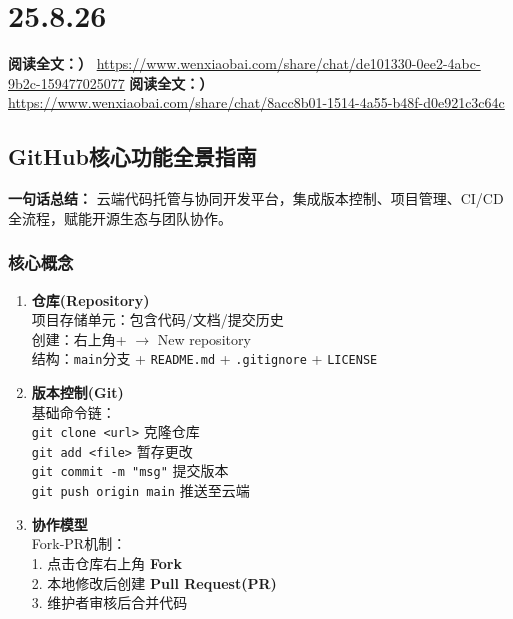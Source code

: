 \chapter{25.8.26}
\vspace{1cm}
\noindent\textbf{阅读全文：）} \url{https://www.wenxiaobai.com/share/chat/de101330-0ee2-4abc-9b2c-159477025077}
\noindent\textbf{阅读全文：）} \url{https://www.wenxiaobai.com/share/chat/8acc8b01-1514-4a55-b48f-d0e921c3c64c}

\section{GitHub核心功能全景指南}
\textbf{一句话总结：}  
云端代码托管与协同开发平台，集成版本控制、项目管理、CI/CD全流程，赋能开源生态与团队协作。
\subsection{核心概念}
\begin{enumerate}[leftmargin=*, nosep]
    \item \textbf{仓库(Repository)}  \\ 
    项目存储单元：包含代码/文档/提交历史 \\
    创建：右上角+ $\rightarrow$ New repository \\
    结构：\texttt{main}分支 + \texttt{README.md} + \texttt{.gitignore} + \texttt{LICENSE}
    
    \item \textbf{版本控制(Git)}  \\
    基础命令链：\\
    \texttt{git clone <url>} \quad 克隆仓库 \\
    \texttt{git add <file>} \quad 暂存更改 \\
    \texttt{git commit -m "msg"} \quad 提交版本 \\
    \texttt{git push origin main} \quad 推送至云端
    
    \item \textbf{协作模型} \\
    Fork-PR机制：\\
    1. 点击仓库右上角 \textbf{Fork} \\
    2. 本地修改后创建 \textbf{Pull Request(PR)} \\
    3. 维护者审核后合并代码
\end{enumerate}

